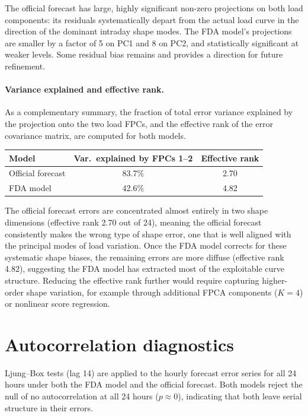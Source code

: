\documentclass[10pt,a4paper]{article}
\begin{document}
\noindent The official forecast has large, highly significant non-zero projections on both load components: its residuals systematically depart from the actual load curve in the direction of the dominant intraday shape modes. The FDA model's projections are smaller by a factor of 5 on PC1 and 8 on PC2, and statistically significant at weaker levels. Some residual bias remains and provides a direction for future refinement.

\paragraph{Variance explained and effective rank.}  As a complementary summary, the fraction of total error variance explained by the projection onto the two load FPCs, and the effective rank of the error covariance matrix, are computed for both models.

\begin{center}
\fontsize{8.2}{9.5}\selectfont
\begin{tabular}{lcc}
\toprule
Model & Var.\ explained by FPCs 1--2 & Effective rank\\
\midrule
Official forecast & 83.7\% & 2.70\\
FDA model         & 42.6\% & 4.82\\
\bottomrule
\end{tabular}
\end{center}

\fontsize{9.2}{10.8}\selectfont

\noindent The official forecast errors are concentrated almost entirely in two shape dimensions (effective rank 2.70 out of 24), meaning the official forecast consistently makes the wrong type of shape error, one that is well aligned with the principal modes of load variation. Once the FDA model corrects for these systematic shape biases, the remaining errors are more diffuse (effective rank 4.82), suggesting the FDA model has extracted most of the exploitable curve structure. Reducing the effective rank further would require capturing higher-order shape variation, for example through additional FPCA components (\(K = 4\)) or nonlinear score regression.

\section*{Autocorrelation diagnostics}

Ljung--Box tests (lag 14) are applied to the hourly forecast error series for all 24 hours under both the FDA model and the official forecast. Both models reject the null of no autocorrelation at all 24 hours (\(p \approx 0\)), indicating that both leave serial structure in their errors.
\end{document}
